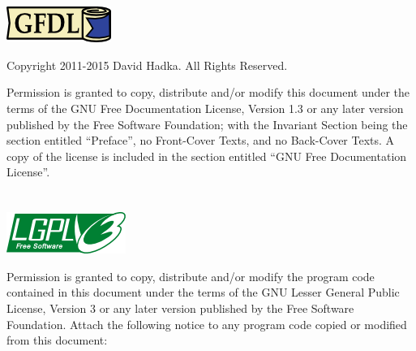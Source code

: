 %
%

\chapter*{}

\begin{center}
\includegraphics{gfdl.png}
\end{center}

\vspace{1em}
\noindent
Copyright 2011-2015 David Hadka.  All Rights Reserved.

\vspace{1em}
\noindent
Permission is granted to copy, distribute and/or modify this document under the terms of the GNU Free Documentation License, Version 1.3 or any later version published by the Free Software Foundation; with the Invariant Section being the section entitled ``Preface'', no Front-Cover Texts, and no Back-Cover Texts.  A copy of the license is included in the section entitled ``GNU Free Documentation License''.

\chapter*{}

\begin{center}
\includegraphics{lgpl.png}
\end{center}

\vspace{1em}
\noindent
Permission is granted to copy, distribute and/or modify the program code contained in this document under the terms of the GNU Lesser General Public License, Version 3 or any later version published by the Free Software Foundation.  Attach the following notice to any program code copied or modified from this document:

